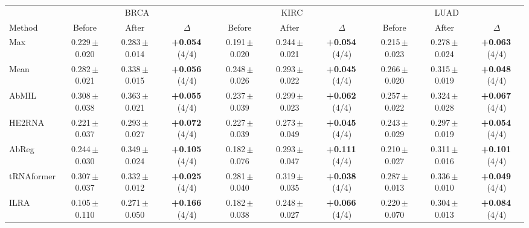 \begin{tabular}{lccccccccc}
\toprule
& \multicolumn{3}{c}{BRCA} & \multicolumn{3}{c}{KIRC} & \multicolumn{3}{c}{LUAD}\\
\cmidrule(lr){2-4}\cmidrule(lr){5-7}\cmidrule(lr){8-10}
Method & Before & After & $\Delta$ & Before & After & $\Delta$ & Before & After & $\Delta$\\
\midrule
Max & 0.229\,{\tiny$\pm$0.020} & 0.283\,{\tiny$\pm$0.014} & \textbf{+0.054}\,{\tiny(4/4)} & 0.191\,{\tiny$\pm$0.020} & 0.244\,{\tiny$\pm$0.021} & \textbf{+0.054}\,{\tiny(4/4)} & 0.215\,{\tiny$\pm$0.023} & 0.278\,{\tiny$\pm$0.024} & \textbf{+0.063}\,{\tiny(4/4)}\\
Mean & 0.282\,{\tiny$\pm$0.021} & 0.338\,{\tiny$\pm$0.015} & \textbf{+0.056}\,{\tiny(4/4)} & 0.248\,{\tiny$\pm$0.026} & 0.293\,{\tiny$\pm$0.022} & \textbf{+0.045}\,{\tiny(4/4)} & 0.266\,{\tiny$\pm$0.020} & 0.315\,{\tiny$\pm$0.019} & \textbf{+0.048}\,{\tiny(4/4)}\\
AbMIL & 0.308\,{\tiny$\pm$0.038} & 0.363\,{\tiny$\pm$0.021} & \textbf{+0.055}\,{\tiny(4/4)} & 0.237\,{\tiny$\pm$0.039} & 0.299\,{\tiny$\pm$0.023} & \textbf{+0.062}\,{\tiny(4/4)} & 0.257\,{\tiny$\pm$0.022} & 0.324\,{\tiny$\pm$0.028} & \textbf{+0.067}\,{\tiny(4/4)}\\
HE2RNA & 0.221\,{\tiny$\pm$0.037} & 0.293\,{\tiny$\pm$0.027} & \textbf{+0.072}\,{\tiny(4/4)} & 0.227\,{\tiny$\pm$0.039} & 0.273\,{\tiny$\pm$0.049} & \textbf{+0.045}\,{\tiny(4/4)} & 0.243\,{\tiny$\pm$0.029} & 0.297\,{\tiny$\pm$0.019} & \textbf{+0.054}\,{\tiny(4/4)}\\
AbReg & 0.244\,{\tiny$\pm$0.030} & 0.349\,{\tiny$\pm$0.024} & \textbf{+0.105}\,{\tiny(4/4)} & 0.182\,{\tiny$\pm$0.076} & 0.293\,{\tiny$\pm$0.047} & \textbf{+0.111}\,{\tiny(4/4)} & 0.210\,{\tiny$\pm$0.027} & 0.311\,{\tiny$\pm$0.016} & \textbf{+0.101}\,{\tiny(4/4)}\\
tRNAformer & 0.307\,{\tiny$\pm$0.037} & 0.332\,{\tiny$\pm$0.012} & \textbf{+0.025}\,{\tiny(4/4)} & 0.281\,{\tiny$\pm$0.040} & 0.319\,{\tiny$\pm$0.035} & \textbf{+0.038}\,{\tiny(4/4)} & 0.287\,{\tiny$\pm$0.013} & 0.336\,{\tiny$\pm$0.010} & \textbf{+0.049}\,{\tiny(4/4)}\\
ILRA & 0.105\,{\tiny$\pm$0.110} & 0.271\,{\tiny$\pm$0.050} & \textbf{+0.166}\,{\tiny(4/4)} & 0.182\,{\tiny$\pm$0.038} & 0.248\,{\tiny$\pm$0.027} & \textbf{+0.066}\,{\tiny(4/4)} & 0.220\,{\tiny$\pm$0.070} & 0.304\,{\tiny$\pm$0.013} & \textbf{+0.084}\,{\tiny(4/4)}\\

\end{tabular}
